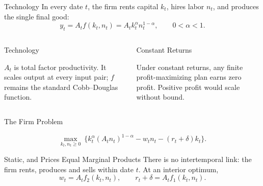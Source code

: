 \documentclass[11pt,aspectratio=169,c]{beamer}
\begin{document}
\begin{frame}{Technology}
  In every date $t$, the firm rents capital $k_t$, hires labor $n_t$, and
  produces the single final good:
  \[
    y_t=A_t f(k_t,n_t)
    =
    A_t k_t^\alpha n_t^{1-\alpha},
    \qquad 0<\alpha<1.
  \]

  \begin{columns}[t,onlytextwidth]
    \begin{column}{\tightcolumnwidth}
      \begin{block}{Technology}
        \begin{minipage}[t][1.65cm][t]{\dimexpr\linewidth-.76em\relax}
          \raggedright
          $A_t$ is total factor productivity. It scales output at every input
          pair; $f$ remains the standard Cobb--Douglas function.
        \end{minipage}
      \end{block}
    \end{column}
    \hspace{\twocolumngutter}
    \begin{column}{\tightcolumnwidth}
      \begin{block}{Constant Returns}
        \begin{minipage}[t][1.65cm][t]{\dimexpr\linewidth-.76em\relax}
          \raggedright
          Under constant returns, any finite profit-maximizing plan earns zero
          profit. Positive profit would scale without bound.
        \end{minipage}
      \end{block}
    \end{column}
  \end{columns}

  \vspace{.35em}
\end{frame}

\begin{frame}{The Firm Problem}
  \begin{definitionbox}
    \[
      \max_{k_t,n_t\geq0}\
      \bigl\{k_t^\alpha(A_tn_t)^{1-\alpha}-w_tn_t-(r_t+\delta)k_t\bigr\}.
    \]
  \end{definitionbox}

  \begin{block}{Static, and Prices Equal Marginal Products}
    There is no intertemporal link: the firm rents, produces and sells within
    date $t$. At an interior optimum,
    \[
      w_t=A_tf_2(k_t,n_t),
      \qquad
      r_t+\delta=A_tf_1(k_t,n_t).
    \]
  \end{block}
\end{frame}
\end{document}
